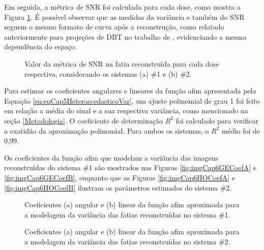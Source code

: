 Em seguida, a métrica de \acs{SNR} foi calculada para cada dose, como mostra a Figura \ref{fig:imgCap6SNR}. É possível observar que as medidas da variância e também do \acs{SNR} seguem o mesmo formato de curva após a reconstrução, como relatado anteriormente para projeções de \acs{DBT} no trabalho de , evidenciando a mesma dependência do espaço.


\begin{figure}[htb]
	\centering
	\caption{Valor da métrica de \acs{SNR} na fatia reconstruída para cada dose respectiva, considerando os sistemas (a) \#1 e (b) \#2.}
	
	
	\label{fig:imgCap6SNR}  
\end{figure}


Para estimar os coeficientes angulares e lineares da função afim apresentada pela Equação \ref{eq:eqCap5HeteroscedasticoVar}, um ajuste polinomial de grau 1 foi feito em relação a média do sinal e a sua respectiva variância, como mencionado na seção \ref{Metodologia}. O coeficiente de determinação $R^2$ foi calculado para verificar a exatidão da aproximação polinomial. Para ambos os sistemas, o $R^2$ médio foi de 0,99. 

Os coeficientes da função afim que modelam a variância das imagens reconstruídas do sistema \#1 são mostrados nas Figuras \ref{fig:imgCap6GECoefA} e \ref{fig:imgCap6GECoefB}, enquanto que as Figuras \ref{fig:imgCap6HOCoefA} e \ref{fig:imgCap6HOCoefB} ilustram os parâmetros estimados do sistema \#2.


\begin{figure}[htb]
	\centering
	\caption{Coeficientes (a) angular e (b) linear da função afim aproximada para a modelagem da variância das fatias reconstruídas no sistema \#1.}
	\hfill
	\label{fig:imgCap6GECoef}
\end{figure}

\begin{figure}[htb]
	\centering
	\caption{Coeficientes (a) angular e (b) linear da função afim aproximada para a modelagem da variância das fatias reconstruídas no sistema \#2.} 
	\hfill
	\label{fig:imgCap6HOCoef}
\end{figure}

